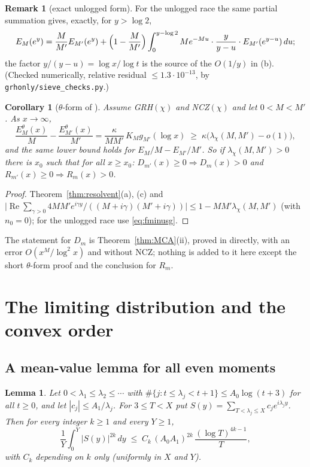 \documentclass[11pt]{amsart}
\newtheorem{lemma}[theorem]{Lemma}
\newtheorem{corollary}[theorem]{Corollary}
\theoremstyle{definition}
\newtheorem{remark}[theorem]{Remark}
\numberwithin{equation}{section}
\newcommand{\re}{\operatorname{Re}}
\newcommand{\Ein}{E^{\theta}}
\begin{document}
\begin{remark}[exact unlogged form]\label{rem:exactunlogged}
For the unlogged race the same partial summation gives, exactly, for
$y>\log2$,
\[
E_M(e^y)=\frac{M}{M'}E_{M'}(e^y)+\Bigl(1-\frac{M}{M'}\Bigr)
\int_0^{y-\log2}Me^{-Mu}\cdot\frac{y}{y-u}\cdot E_{M'}(e^{y-u})\,du ;
\]
the factor $y/(y-u)=\log x/\log t$ is the source of the $O(1/y)$ in
(b). (Checked numerically, relative residual $\le1.3\cdot10^{-13}$,
by \texttt{grhonly/sieve\_checks.py}.)
\end{remark}

\begin{corollary}[$\theta$-form of {\cite[Theorem~A]{MC}}]
\label{cor:thetaA}
Assume GRH$(\chi)$ and NCZ$(\chi)$ and let $0<M<M'$. As
$x\to\infty$,
\[
\frac{\Ein_M(x)}{M}-\frac{\Ein_{M'}(x)}{M'}
=\frac{\kappa}{MM'}\,K_Mg_{M'}(\log x)
\;\ge\;\kappa\bigl(\lambda_\chi(M,M')-o(1)\bigr),
\]
and the same lower bound holds for $E_M/M-E_{M'}/M'$. So if
$\lambda_\chi(M,M')>0$ there is $x_0$ such that for all $x\ge x_0$:
$D_{m'}(x)\ge0\Rightarrow D_m(x)>0$ and
$R_{m'}(x)\ge0\Rightarrow R_m(x)>0$.
\end{corollary}

\begin{proof}
Theorem~\ref{thm:resolvent}(a), (c) and
$\bigl|\re\sum_{\gamma>0}4MM'e^{i\gamma y}/((M+i\gamma)(M'+i\gamma))\bigr|
\le1-MM'\lambda_\chi(M,M')$ (with $n_0=0$); for the unlogged race
use \eqref{eq:fminusg}.
\end{proof}

The statement for $D_m$ is Theorem~\ref{thm:MCA}(ii), proved in
\cite{MC} directly, with an error $O(x^M/\log^2x)$ and without
NCZ; nothing is added to it here except the short $\theta$-form
proof and the conclusion for $R_m$.

\section{The limiting distribution and the convex order}
\label{sec:limit}

\subsection{A mean-value lemma for all even moments}

\begin{lemma}\label{lem:moments}
Let $0<\lambda_1\le\lambda_2\le\cdots$ with
$\#\{j:t\le\lambda_j<t+1\}\le A_0\log(t+3)$ for all $t\ge0$, and let
$|c_j|\le A_1/\lambda_j$. For $3\le T<X$ put
$S(y)=\sum_{T<\lambda_j\le X}c_je^{i\lambda_jy}$. Then for every
integer $k\ge1$ and every $Y\ge1$,
\[
\frac1Y\int_0^Y|S(y)|^{2k}\,dy\;\le\;
C_k\,(A_0A_1)^{2k}\,\frac{(\log T)^{4k-1}}{T},
\]
with $C_k$ depending on $k$ only (uniformly in $X$ and $Y$).
\end{lemma}
\end{document}
